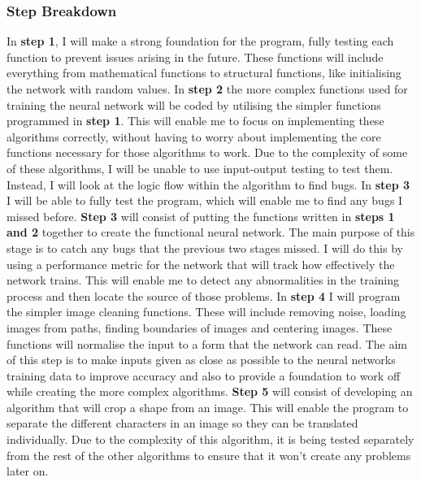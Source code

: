 \documentclass{report}
\begin{document}
\subsubsection{Step Breakdown}
In \textbf{step 1}, I will make a strong foundation for the program, fully testing each function to prevent issues arising in the future. These functions will include everything from mathematical functions to structural functions, like initialising the network with random values.
\newline
\newline
In \textbf{step 2} the more complex functions used for training the neural network will be coded by utilising the simpler functions programmed in \textbf{step 1}. This will enable me to focus on implementing these algorithms correctly, without having to worry about implementing the core functions necessary for those algorithms to work. Due to the complexity of some of these algorithms, I will be unable to use input-output testing to test them. Instead, I will look at the logic flow within the algorithm to find bugs. In \textbf{step 3} I will be able to fully test the program, which will enable me to find any bugs I missed before.
\newline
\newline
\textbf{Step 3} will consist of putting the functions written in \textbf{steps 1 and 2} together to create the functional neural network. The main purpose of this stage is to catch any bugs that the previous two stages missed. I will do this by using a performance metric for the network that will track how effectively the network trains. This will enable me to detect any abnormalities in the training process and then locate the source of those problems.
\newline
\newline
In \textbf{step 4} I will program the simpler image cleaning functions. These will include removing noise, loading images from paths, finding boundaries of images and centering images. These functions will normalise the input to a form that the network can read. The aim of this step is to make inputs given as close as possible to the neural networks training data to improve accuracy and also to provide a foundation to work off while creating the more complex algorithms.
\newline
\newline
\textbf{Step 5} will consist of developing an algorithm that will crop a shape from an image. This will enable the program to separate the different characters in an image so they can be translated individually. Due to the complexity of this algorithm, it is being tested separately from the rest of the other algorithms to ensure that it won't create any problems later on.
\end{document}
